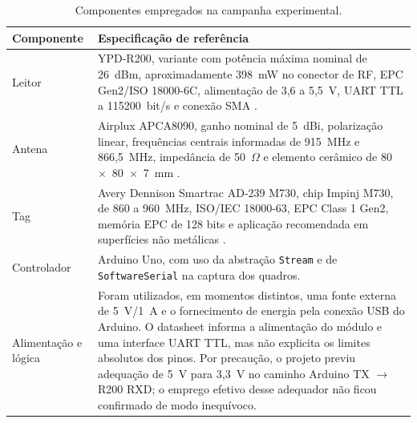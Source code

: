 \begin{table}[htbp]
    \centering
    \caption{Componentes empregados na campanha experimental.}
    \label{tab:materiais-prototipo}
    \small
    \begin{tabularx}{\textwidth}{p{3.8cm}X}
        \toprule
        \textbf{Componente} & \textbf{Especificação de referência} \\
        \midrule
        Leitor & YPD-R200, variante com potência máxima nominal de 26~dBm, aproximadamente 398~mW no conector de RF, EPC Gen2/ISO 18000-6C, alimentação de 3,6 a 5,5~V, UART TTL a 115200~bit/s e conexão SMA \cite{yanpodo2021r200}. \\
        Antena & Airplux APCA8090, ganho nominal de 5~dBi, polarização linear, frequências centrais informadas de 915~MHz e 866,5~MHz, impedância de 50~$\Omega$ e elemento cerâmico de 80~$\times$~80~$\times$~7~mm \cite{airplux2026apca8090}. \\
        Tag & Avery Dennison Smartrac AD-239 M730, chip Impinj M730, de 860 a 960~MHz, ISO/IEC 18000-63, EPC Class 1 Gen2, memória EPC de 128 bits e aplicação recomendada em superfícies não metálicas \cite{avery2022ad239m730}. \\
        Controlador & Arduino Uno, com uso da abstração \texttt{Stream} e de \texttt{SoftwareSerial} na captura dos quadros. \\
        Alimentação e lógica & Foram utilizados, em momentos distintos, uma fonte externa de 5~V/1~A e o fornecimento de energia pela conexão USB do Arduino. O datasheet informa a alimentação do módulo e uma interface UART TTL, mas não explicita os limites absolutos dos pinos. Por precaução, o projeto previu adequação de 5~V para 3,3~V no caminho Arduino TX $\rightarrow$ R200 RXD; o emprego efetivo desse adequador não ficou confirmado de modo inequívoco. \\
        \bottomrule
    \end{tabularx}
\end{table}

